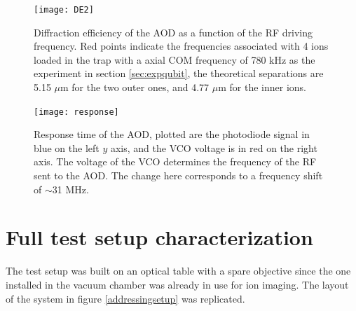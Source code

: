 \begin{figure}
\centering
\texttt{[image: DE2]}
\caption{Diffraction efficiency of the AOD as a function of the RF driving frequency. Red points indicate the frequencies associated with 4 ions loaded in the trap with a axial COM frequency of 780 kHz as the experiment in section \ref{sec:expqubit}, the theoretical separations are 5.15 $\mu$m for the two outer ones, and 4.77 $\mu$m for the inner ions.}
\label{DE}
\end{figure}

\begin{figure}
\centering
\texttt{[image: response]}
\caption{Response time of the AOD, plotted are the photodiode signal in blue on the left $y$ axis, and the VCO voltage is in red on the right axis. The voltage of the VCO determines the frequency of the RF sent to the AOD. The change here corresponds to a frequency shift of $\sim$31 MHz.}
\label{response}
\end{figure}

\section{Full test setup characterization}
\label{sec:fullsetup}
The test setup was built on an optical table with a spare objective since the one installed in the vacuum chamber was already in use for ion imaging. The layout of the system in figure \ref{addressingsetup} was replicated.

